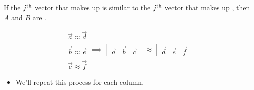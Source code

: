         \begin{concept}
            If the $j^{ \text{th} }$ vector that makes up  is similar to the $j^{ \text{th} }$ vector that makes up , then $A$ and $B$ are .

            \begin{equation*}
                \begin{matrix}
                    \overrightarrow{a} \approx \overrightarrow{d} \\\\
                    \overrightarrow{b} \approx \overrightarrow{e}\\\\
                    \overrightarrow{c} \approx \overrightarrow{f}
                \end{matrix}
                \implies 
                \begin{bmatrix}
                    \overrightarrow{a} & \overrightarrow{b} & \overrightarrow{c}
                \end{bmatrix}
                \approx
                \begin{bmatrix}
                    \overrightarrow{d} & \overrightarrow{e} & \overrightarrow{f}
                \end{bmatrix}
            \end{equation*}


        \end{concept}

        \begin{itemize}
            \item We'll repeat this process for each column.
        \end{itemize}

